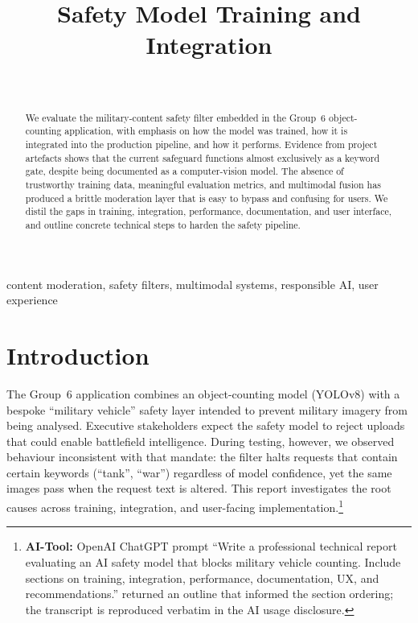 \documentclass[conference]{IEEEtran}
\begin{document}
\title{Safety Model Training and Integration}

\author{\\}

\maketitle
\begin{abstract}
We evaluate the military-content safety filter embedded in the Group~6 object-counting application, with emphasis on how the model was trained, how it is integrated into the production pipeline, and how it performs. Evidence from project artefacts shows that the current safeguard functions almost exclusively as a keyword gate, despite being documented as a computer-vision model. The absence of trustworthy training data, meaningful evaluation metrics, and multimodal fusion has produced a brittle moderation layer that is easy to bypass and confusing for users. We distil the gaps in training, integration, performance, documentation, and user interface, and outline concrete technical steps to harden the safety pipeline.
\end{abstract}

\begin{IEEEkeywords}
content moderation, safety filters, multimodal systems, responsible AI, user experience
\end{IEEEkeywords}

\section{Introduction}
The Group~6 application combines an object-counting model (YOLOv8) with a bespoke ``military vehicle'' safety layer intended to prevent military imagery from being analysed. Executive stakeholders expect the safety model to reject uploads that could enable battlefield intelligence. During testing, however, we observed behaviour inconsistent with that mandate: the filter halts requests that contain certain keywords (``tank'', ``war'') regardless of model confidence, yet the same images pass when the request text is altered. This report investigates the root causes across training, integration, and user-facing implementation.\footnote{\textbf{AI-Tool:} OpenAI ChatGPT prompt ``Write a professional technical report evaluating an AI safety model that blocks military vehicle counting. Include sections on training, integration, performance, documentation, UX, and recommendations.'' returned an outline that informed the section ordering; the transcript is reproduced verbatim in the AI usage disclosure.}
\end{document}
